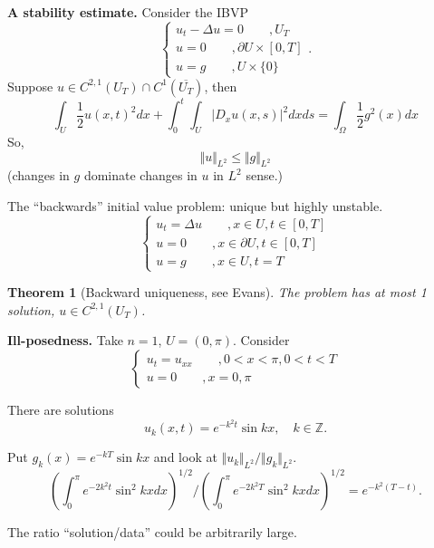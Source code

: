 \documentclass[11pt]{amsart}%
\newtheorem{theorem}{Theorem}
\newcommand\Z{\mathbb{Z}} \newcommand\N{\mathbb{N}} \newcommand\C{\mathbb{C}}
\begin{document}
{\bf A stability estimate.} Consider the IBVP
$$\begin{cases}
    u_t -\Delta u =0 \qquad, U_T\\
    u=0 \qquad, \partial U \times [0,T]\\
    u=g \qquad, U\times\{0\}
\end{cases}.$$
Suppose $u\in C^{2,1}(U_T)\cap C^1(\overline{U_T})$, then
$$\int_U\frac{1}{2} u(x,t)^2 dx + \int_0^t\int_U \vert D_x u(x,s)\vert^2 dxds =\int_\Omega \frac{1}{2}g^2(x)dx$$
So, $$\Vert u\Vert_{L^2} \le \Vert g\Vert_{L^2}$$ (changes in $g$ dominate changes in $u$ in $L^2$ sense.)

The ``backwards'' initial value problem: unique but highly unstable.
$$\begin{cases}
    u_t = \Delta u \qquad, x\in U, t\in [0,T]\\
    u=0 \qquad, x\in \partial U, t\in [0,T]\\
    u=g \qquad, x\in U, t=T
\end{cases}$$

\begin{theorem}[Backward uniqueness, see Evans]
    The problem has at most 1 solution, $u\in C^{2,1}(U_T)$.
\end{theorem}

{\bf Ill-posedness.} Take $n=1$, $U=(0,\pi)$. Consider
$$\begin{cases}
    u_t = u_{xx} \qquad, 0<x<\pi, 0<t<T\\
    u=0 \qquad, x=0,\pi
\end{cases}$$

There are solutions
$$u_k(x,t)=e^{-k^2 t} \sin kx, \quad k\in \Z.$$

Put $g_k(x) = e^{-kT}\sin kx$ and look at $\Vert u_k\Vert_{L^2}/\Vert g_k\Vert_{L^2}$.
$$(\int_0^\pi e^{-2k^2 t}\sin^2 kx dx)^{1/2} / (\int_0^\pi e^{-2k^2 T}\sin^2 kx dx)^{1/2}=e^{-k^2(T-t)}.$$

The ratio ``solution/data'' could be arbitrarily large.
\end{document}
